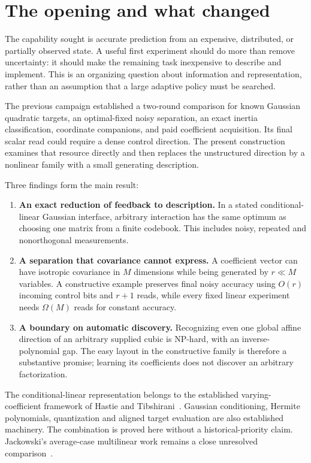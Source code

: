 \documentclass[11pt]{article}
\begin{document}
\tableofcontents
\newpage

\section{The opening and what changed}

The capability sought is accurate prediction from an expensive, distributed, or partially observed state. A useful first experiment should do more than remove uncertainty: it should make the remaining task inexpensive to describe and implement. This is an organizing question about information and representation, rather than an assumption that a large adaptive policy must be searched.

The previous campaign established a two-round comparison for known Gaussian quadratic targets, an optimal-fixed noisy separation, an exact inertia classification, coordinate companions, and paid coefficient acquisition. Its final scalar read could require a dense control direction. The present construction examines that resource directly and then replaces the unstructured direction by a nonlinear family with a small generating description.

Three findings form the main result:
\begin{enumerate}
\item \textbf{An exact reduction of feedback to description.} In a stated conditional-linear Gaussian interface, arbitrary interaction has the same optimum as choosing one matrix from a finite codebook. This includes noisy, repeated and nonorthogonal measurements.
\item \textbf{A separation that covariance cannot express.} A coefficient vector can have isotropic covariance in $M$ dimensions while being generated by $r\ll M$ variables. A constructive example preserves final noisy accuracy using $O(r)$ incoming control bits and $r+1$ reads, while every fixed linear experiment needs $\Omega(M)$ reads for constant accuracy.
\item \textbf{A boundary on automatic discovery.} Recognizing even one global affine direction of an arbitrary supplied cubic is NP-hard, with an inverse-polynomial gap. The easy layout in the constructive family is therefore a substantive promise; learning its coefficients does not discover an arbitrary factorization.
\end{enumerate}

The conditional-linear representation belongs to the established varying-coefficient framework of Hastie and Tibshirani~\cite{hastie}. Gaussian conditioning, Hermite polynomials, quantization and aligned target evaluation are also established machinery. The combination is proved here without a historical-priority claim. Jackowski's average-case multilinear work remains a close unresolved comparison~\cite{jackowski}.
\end{document}
